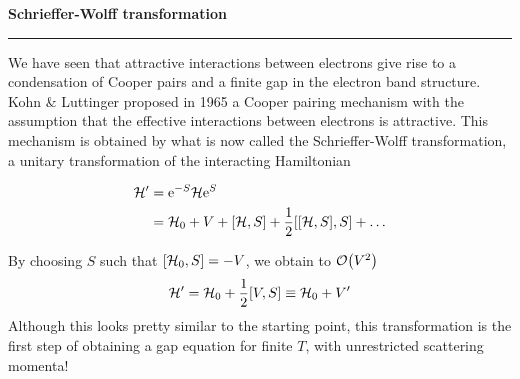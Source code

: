 
\begin{frame}
	\begin{block}{\color{white}\textbf{\Large{
				Schrieffer-Wolff transformation
		}}}
		\vspace{-10pt}\rule{\textwidth}{0.5pt}
		\color{white}
		We have seen that attractive interactions between electrons give rise to a condensation of Cooper pairs and a finite gap in the electron band structure. 
		Kohn \& Luttinger proposed in 1965 a Cooper pairing mechanism with the assumption that the effective interactions between electrons is attractive. This mechanism is obtained by what is now called the Schrieffer-Wolff transformation, a unitary transformation of the interacting Hamiltonian
	\end{block}
	{\large
		\vspace{-2em}
		\begin{align*}
			\mathcal{H}' &= \e^{-S}\mathcal{H}\e^{S} \\
			&= \mathcal{H}_0 + V + \comm{\mathcal{H}}{S} + \frac{1}{2}\comm{\comm{\mathcal{H}}{S}}{S} +\dots
		\end{align*}
	}
	
	\begin{block}{}
		\color{white}
		\vspace{-3em}
		By choosing $S$ such that $\comm{\mathcal{H}_0}{S} = -V$, we obtain to $\order{V^2}$
\vspace{-1em}
		\begin{equation*}
				\mathcal{H}' = \mathcal{H}_0 + \frac{1}{2}\comm{V}{S} \equiv  \mathcal{H}_0 + V'
		\end{equation*}
Although this looks pretty similar to the starting point, this transformation is the first step of obtaining a gap equation for finite $T$, with unrestricted scattering momenta!	
\end{block}
	
	
\end{frame}